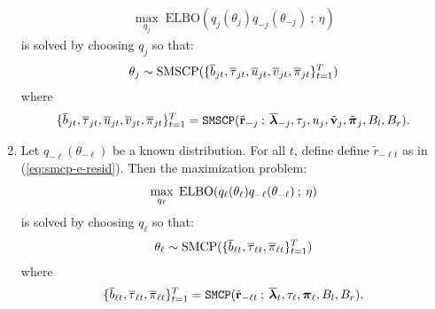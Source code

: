 \begin{proposition}
\begin{enumerate}[label=\roman*.]
\begin{align}
        \max_{q_j} \; \text{ELBO}(q_j(\theta_j)q_{-j}(\theta_{-j}) \:;\: \eta)\label{eq:elbo-j}
    \end{align}
    is solved by choosing $q_j$ so that: 
    \begin{align*}
        \normalfont
        \theta_j \sim \text{SMSCP}(\{\overline{b}_{jt}, \overline{\tau}_{jt}, \overline{u}_{jt}, \overline{v}_{jt}, \overline{\pi}_{jt}\}_{t=1}^T)
    \end{align*}
    where 
    \begin{align*}
        \normalfont
        \{\overline{b}_{jt}, \overline{\tau}_{jt}, \overline{u}_{jt}, \overline{v}_{jt}, \overline{\pi}_{jt}\}_{t=1}^T = \texttt{SMSCP}(\tilde{\mathbf{r}}_{-j} \:;\:\overline{\boldsymbol{\lambda}}_{-j}, \tau_j, u_j, \tilde{\mathbf{v}}_j, \tilde{\boldsymbol{\pi}}_j, B_l,B_r).
    \end{align*}

    \item Let $q_{-\ell}(\theta_{-\ell})$ be a known distribution. For all $t$, define define $\tilde{r}_{-\ell t}$ as in (\ref{eq:smcp-e-resid}). Then the maximization problem:
    \begin{align}
        \normalfont
        \max_{q_\ell} \; \text{ELBO}(q_\ell(\theta_\ell)q_{-\ell}(\theta_{-\ell}) \:;\: \eta) \label{eq:elbo-l}
    \end{align}
    is solved by choosing $q_\ell$ so that: 
    \begin{align*}
        \normalfont
        \theta_\ell \sim \text{SMCP}(\{\overline{b}_{\ell t}, \overline{\tau}_{\ell t}, \overline{\pi}_{\ell t}\}_{t=1}^T)
    \end{align*}
    where 
    \begin{align*}
        \normalfont
        \{\overline{b}_{\ell t}, \overline{\tau}_{\ell t}, \overline{\pi}_{\ell t}\}_{t=1}^T= \texttt{SMCP}(\tilde{\mathbf{r}}_{-\ell t} \:;\: \overline{\boldsymbol{\lambda}}_t, \tau_{\ell}, \boldsymbol{\pi}_{\ell}, B_l,B_r).
    \end{align*}


\end{enumerate}
\end{proposition}
